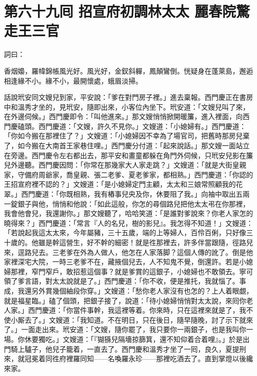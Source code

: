 
\chapter*{第六十九囘 招宣府初調林太太 麗春院驚走王三官}


詞曰：

\begin{myquote} 
香烟嬝，羅幃錦帳風光好。風光好，金釵斜軃，鳳顛鸞倒。恍疑身在蓬萊島，邂逅相逢緣不小。緣不小，最開懷處，蛾眉淡掃。

\end{myquote} 

話說玳安同文嫂兒到家，平安說：「爹在對門房子裡。」進去稟報。西門慶正在書房中和溫秀才坐的，見玳安，隨即出來，小客位內坐下。玳安道：「文嫂兒叫了來，在外邊伺候。」西門慶即令：「叫他進來。」那文嫂悄悄掀開暖簾，進入裡面，向西門慶磕頭。西門慶道：「文嫂，許久不見你。」文嫂道：「小媳婦有。」西門慶道：「你如今搬在那裡住了？」文嫂道：「小媳婦因不幸為了場官司，把舊時那房兒棄了，如今搬在大南首王家巷住哩。」西門慶分付道：「起來說話。」那文嫂一面站立在旁邊。西門慶令左右都出去，那平安和畫童都躲在角門外伺候，只玳安兒影在簾兒外邊聽。西門慶因問：「你常在那幾家大人家走跳？」文嫂道：「就是大街皇親家，守備府周爺家，喬皇親、張二老爹、夏老爹家，都相熟。」西門慶道：「你認的王招宣府裡不認的？」文嫂道：「是小媳婦定門主顧，太太和三娘常照顧我的花翠。」西門慶道：「你既相熟，我有樁事兒央及你，休要阻了我。」向袖中取出五兩一錠銀子與他，悄悄和他說：「如此這般，你怎的尋個路兒把他太太弔在你那裡，我會他會兒，我還謝你。」那文嫂聽了，哈哈笑道：「是誰對爹說來？你老人家怎的曉得來？」西門慶道：「常言『人的名兒，樹的影兒』。我怎得不知道！」文嫂道：「若說起我這太太來，今年屬豬，三十五歲，端的上等婦人，百伶百俐，只好像三十歲的。{}他雖是幹這營生，好不幹的細密！就是徃那裡去，許多伴當跟隨，徑路兒來，逕路兒去。三老爹在外為人做人，他怎在人家落脚？這個人傳的訛了。倒是他家裡深宅大院，一時三老爹不在，藏掖個兒去，人不知鬼不覺，倒還許。若是小媳婦那裡，窄門窄戶，敢招惹這個事？就是爹賞的這銀子，小媳婦也不敢領去。寧可領了爹言語，對太太說就是了。」西門慶道：「你不收，便是推托，我就惱了。事成，我還另外賞幾個紬段你穿。」文嫂道：「愁你老人家沒有也怎的？上人着眼覷，就是福星臨。」磕了個頭，把銀子接了，說道：「待小媳婦悄悄對太太說，來囘你老人家。」西門慶道：「你當件事幹，我這裡等着。你來時，只在這裡來就是了，我不使小厮去了。」文嫂道：「我知道。不在明日，只在後日，隨早隨晚，討了示下就來了。」一面走出來。玳安道：「文嫂，隨你罷了，我只要你一兩銀子，也是我叫你一場。你休要獨吃。」文嫂道：「『猢猻兒隔墻掠篩箕，還不知仰着合着哩』。」於是出門騎上驢子，他兒子籠着，一直去了。西門慶和溫秀才坐了一囘，良久，夏提刑來，就冠冕着同徃府裡羅同知——名喚羅永珍——那裡吃酒去了。直到掌燈以後纔來家。

